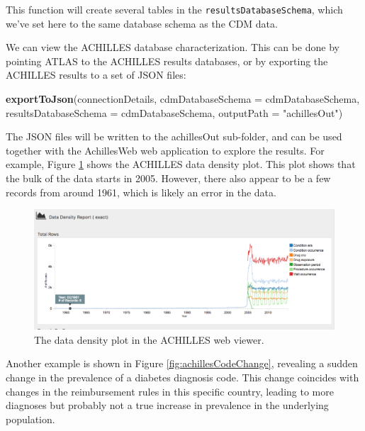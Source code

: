 \documentclass[11pt]{book}
\newenvironment{Shaded}{\begin{snugshade}}{\end{snugshade}}
\newcommand{\KeywordTok}[1]{\textcolor[rgb]{0.13,0.29,0.53}{\textbf{#1}}}
\newcommand{\DataTypeTok}[1]{\textcolor[rgb]{0.13,0.29,0.53}{#1}}
\newcommand{\StringTok}[1]{\textcolor[rgb]{0.31,0.60,0.02}{#1}}
\newcommand{\NormalTok}[1]{#1}
\theoremstyle{definition}
\theoremstyle{definition}
\theoremstyle{definition}
\theoremstyle{remark}
\begin{document}
This function will create several tables in the
\texttt{resultsDatabaseSchema}, which we've set here to the same
database schema as the CDM data.

We can view the ACHILLES database characterization. This can be done by
pointing ATLAS to the ACHILLES results databases, or by exporting the
ACHILLES results to a set of JSON files:

\begin{Shaded}
\begin{Highlighting}[]
\KeywordTok{exportToJson}\NormalTok{(connectionDetails,}
             \DataTypeTok{cdmDatabaseSchema =}\NormalTok{ cdmDatabaseSchema,}
             \DataTypeTok{resultsDatabaseSchema =}\NormalTok{ cdmDatabaseSchema,}
             \DataTypeTok{outputPath =} \StringTok{"achillesOut"}\NormalTok{)}
\end{Highlighting}
\end{Shaded}

The JSON files will be written to the achillesOut sub-folder, and can be
used together with the AchillesWeb web application to explore the
results. For example, Figure \ref{fig:achillesDataDensity} shows the
ACHILLES data density plot. This plot shows that the bulk of the data
starts in 2005. However, there also appear to be a few records from
around 1961, which is likely an error in the data.

\begin{figure}

{\centering \includegraphics[width=1\linewidth]{images/DataQuality/achillesDataDensity} 

}

\caption{The data density plot in the ACHILLES web viewer.}\label{fig:achillesDataDensity}
\end{figure}

Another example is shown in Figure \ref{fig:achillesCodeChange},
revealing a sudden change in the prevalence of a diabetes diagnosis
code. This change coincides with changes in the reimbursement rules in
this specific country, leading to more diagnoses but probably not a true
increase in prevalence in the underlying population.
\end{document}
